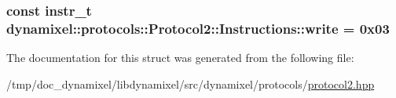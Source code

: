 \subsubsection[{write}]{\setlength{\rightskip}{0pt plus 5cm}const {\bf instr\+\_\+t} dynamixel\+::protocols\+::\+Protocol2\+::\+Instructions\+::write = 0x03\hspace{0.3cm}{\ttfamily [static]}}\label{structdynamixel_1_1protocols_1_1_protocol2_1_1_instructions_a8962296bdcb1cc06e0a27d0e6a005bf4}


The documentation for this struct was generated from the following file\+:\begin{DoxyCompactItemize}
\item 
/tmp/doc\+\_\+dynamixel/libdynamixel/src/dynamixel/protocols/\hyperlink{protocol2_8hpp}{protocol2.\+hpp}\end{DoxyCompactItemize}

